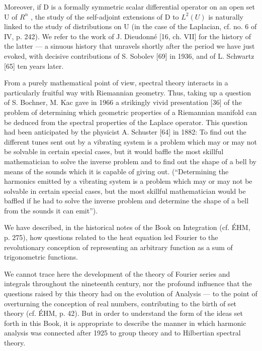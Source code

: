Moreover, if D is a formally symmetric scalar differential operator on an open set U of \(R^{n}\) , the study of the self-adjoint extensions of D to \(L^{2}(U)\) is naturally linked to the study of distributions on U (in the case of the Laplacian, cf. no. 6 of IV, p. 242). We refer to the work of J. Dieudonné {[}16, ch. VII{]} for the history of the latter --- a sinuous history that unravels shortly after the period we have just evoked, with decisive contributions of S. Sobolev {[}69{]} in 1936, and of L. Schwartz {[}65{]} ten years later.

From a purely mathematical point of view, spectral theory interacts in a particularly fruitful way with Riemannian geometry. Thus, taking up a question of S. Bochner, M. Kac gave in 1966 a strikingly vivid presentation {[}36{]} of the problem of determining which geometric properties of a Riemannian manifold can be deduced from the spectral properties of the Laplace operator. This question had been anticipated by the physicist A. Schuster {[}64{]} in 1882: To find out the different tunes sent out by a vibrating system is a problem which may or may not be solvable in certain special cases, but it would baffle the most skillful mathematician to solve the inverse problem and to find out the shape of a bell by means of the sounds which it is capable of giving out. (“Determining the harmonics emitted by a vibrating system is a problem which may or may not be solvable in certain special cases, but the most skillful mathematician would be baffled if he had to solve the inverse problem and determine the shape of a bell from the sounds it can emit”).


We have described, in the historical notes of the Book on Integration (cf. ÉHM, p. 275), how questions related to the heat equation led Fourier to the revolutionary conception of representing an arbitrary function as a sum of trigonometric functions.

We cannot trace here the development of the theory of Fourier series and integrals throughout the nineteenth century, nor the profound influence that the questions raised by this theory had on the evolution of Analysis --- to the point of overturning the conception of real numbers, contributing to the birth of set theory (cf. ÉHM, p. 42). But in order to understand the form of the ideas set forth in this Book, it is appropriate to describe the manner in which harmonic analysis was connected after 1925 to group theory and to Hilbertian spectral theory.

